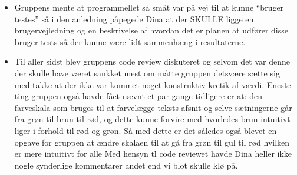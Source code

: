 \documentclass[a4paper,10pt,draft]{article}
\begin{document}
\begin{itemize}
\item Gruppens mente at programmellet så småt var på vej til at kunne ``bruger testes'' så i den anledning påpegede Dina at der \underline{SKULLE} ligge en brugervejledning og en beskrivelse af hvordan det er planen at udfører disse bruger tests så der kunne være lidt sammenhæng i resultaterne.

\item Til aller sidst blev gruppens code review diskuteret og selvom det var denne der skulle have været sankket mest om måtte gruppen detsvære sætte sig med takke at der ikke var kommet noget konstruktiv kretik af værdi.
Eneste ting gruppen også havde fået nævnt et par gange tidligere er at: den farveskala som bruges til at farvelægge teksts afsnit og selve sætningerne går fra grøn til brun til rød, og dette kunne forvire med hvorledes brun intuitivt liger i forhold til rød og grøn. Så med dette er det således også blevet en opgave for gruppen at ændre skalaen til at gå fra grøn til gul til rød hvilken er mere intuitivt for alle 
Med hensyn tl code reviewet havde Dina heller ikke nogle synderlige kommentarer andet end vi blot skulle klø på.

\end{itemize}
\end{document}
